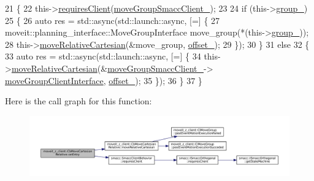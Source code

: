 \begin{DoxyCode}
21 \{
22   this->\hyperlink{classsmacc_1_1SmaccClientBehavior_a917f001e763a1059af337bf4e164f542}{requiresClient}(\hyperlink{classmoveit__z__client_1_1CbMoveCartesianRelative_abe1a99706adf6cb61aacb034e0b6a4c9}{moveGroupSmaccClient\_});
23 
24   \textcolor{keywordflow}{if} (this->\hyperlink{classmoveit__z__client_1_1CbMoveCartesianRelative_a45ff6b4ef0f48f75101f97fe1b5ff58d}{group\_})
25   \{
26     \textcolor{keyword}{auto} res = std::async(std::launch::async, [=] \{
27       moveit::planning\_interface::MoveGroupInterface move\_group(*(this->\hyperlink{classmoveit__z__client_1_1CbMoveCartesianRelative_a45ff6b4ef0f48f75101f97fe1b5ff58d}{group\_}));
28       this->\hyperlink{classmoveit__z__client_1_1CbMoveCartesianRelative_aa8535a52826c36b103abebba6da7737f}{moveRelativeCartesian}(&move\_group, \hyperlink{classmoveit__z__client_1_1CbMoveCartesianRelative_aa5316f2f734336722a353a8e9addea95}{offset\_});
29     \});
30   \}
31   \textcolor{keywordflow}{else}
32   \{
33     \textcolor{keyword}{auto} res = std::async(std::launch::async, [=] \{
34       this->\hyperlink{classmoveit__z__client_1_1CbMoveCartesianRelative_aa8535a52826c36b103abebba6da7737f}{moveRelativeCartesian}(&\hyperlink{classmoveit__z__client_1_1CbMoveCartesianRelative_abe1a99706adf6cb61aacb034e0b6a4c9}{moveGroupSmaccClient\_}->
      \hyperlink{classmoveit__z__client_1_1ClMoveGroup_af86e046b837be0ef4afa9893d8808f20}{moveGroupClientInterface}, \hyperlink{classmoveit__z__client_1_1CbMoveCartesianRelative_aa5316f2f734336722a353a8e9addea95}{offset\_});
35     \});
36   \}
37 \}
\end{DoxyCode}
Here is the call graph for this function\+:
\nopagebreak
\begin{figure}[H]
\begin{center}
\leavevmode
\includegraphics[width=350pt]{classmoveit__z__client_1_1CbMoveCartesianRelative_aaea0e6c7431f93301a77269b8fa539f8_cgraph}
\end{center}
\end{figure}
\mbox{\label{classmoveit__z__client_1_1CbMoveCartesianRelative_a539af37d16cffdc51127c7a5206504cb}} 
